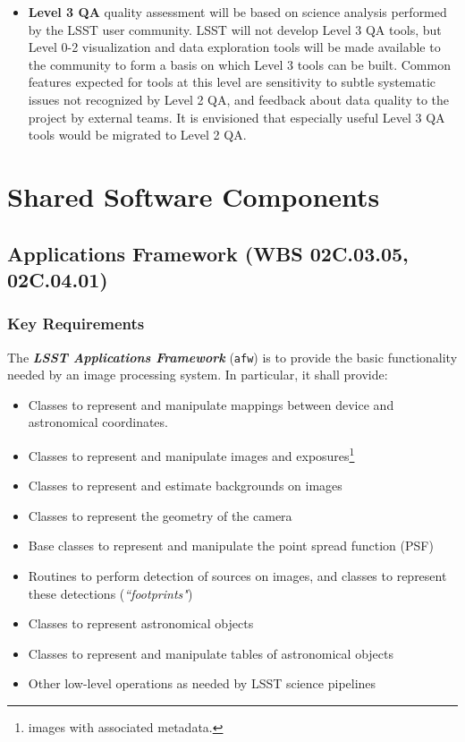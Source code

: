 \documentclass[12pt]{article}
\newcommand{\wbsAFW}{WBS 02C.03.05, 02C.04.01}
\begin{document}
\begin{itemize}
    \item {\bf Level 3 QA} quality assessment will be based on science analysis performed by the LSST user community. LSST will not develop Level 3 QA tools, but Level 0-2 visualization and data exploration tools will be made available to the community to form a basis on which Level 3 tools can be built. Common features expected for tools at this level are sensitivity to subtle systematic issues not recognized by Level 2 QA, and feedback about data quality to the project by external teams. It is envisioned that especially useful Level 3 QA tools would be migrated to Level 2 QA.

\end{itemize}

\clearpage

\section{Shared Software Components}

\subsection{Applications Framework (\wbsAFW)}

\subsubsection{Key Requirements}

The {\bf \em LSST Applications Framework} ({\tt afw}) is to provide the basic functionality needed by an image processing system. In particular, it shall provide:
%
\begin{itemize}
    \item Classes to represent and manipulate mappings between device and astronomical coordinates.
    \item Classes to represent and manipulate images and exposures\footnote{images with associated metadata.}
    \item Classes to represent and estimate backgrounds on images
    \item Classes to represent the geometry of the camera
    \item Base classes to represent and manipulate the point spread function (PSF)
    \item Routines to perform detection of sources on images, and classes to represent these detections ({\em ``footprints"})
    \item Classes to represent astronomical objects
    \item Classes to represent and manipulate tables of astronomical objects
    \item Other low-level operations as needed by LSST science pipelines 
\end{itemize}
\end{document}
